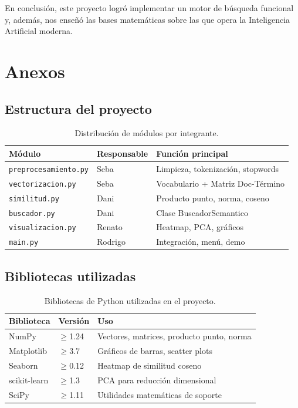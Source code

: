 \documentclass[12pt, a4paper]{article}
\begin{document}
En conclusión, este proyecto logró implementar un motor de búsqueda funcional y, además, nos enseñó las bases matemáticas sobre las que opera la Inteligencia Artificial moderna.

\section{Anexos}

\subsection{Estructura del proyecto}

\begin{table}[H]
\centering
\begin{tabular}{|l|l|l|}
\hline
\textbf{Módulo} & \textbf{Responsable} & \textbf{Función principal} \\
\hline
\texttt{preprocesamiento.py} & Seba & Limpieza, tokenización, stopwords \\
\texttt{vectorizacion.py} & Seba & Vocabulario + Matriz Doc-Término \\
\texttt{similitud.py} & Dani & Producto punto, norma, coseno \\
\texttt{buscador.py} & Dani & Clase BuscadorSemantico \\
\texttt{visualizacion.py} & Renato & Heatmap, PCA, gráficos \\
\texttt{main.py} & Rodrigo & Integración, menú, demo \\
\hline
\end{tabular}
\caption{Distribución de módulos por integrante.}
\end{table}

\subsection{Bibliotecas utilizadas}
\begin{table}[H]
\centering
\begin{tabular}{|l|l|l|}
\hline
\textbf{Biblioteca} & \textbf{Versión} & \textbf{Uso} \\
\hline
NumPy & $\geq$1.24 & Vectores, matrices, producto punto, norma \\
Matplotlib & $\geq$3.7 & Gráficos de barras, scatter plots \\
Seaborn & $\geq$0.12 & Heatmap de similitud coseno \\
scikit-learn & $\geq$1.3 & PCA para reducción dimensional \\
SciPy & $\geq$1.11 & Utilidades matemáticas de soporte \\
\hline
\end{tabular}
\caption{Bibliotecas de Python utilizadas en el proyecto.}
\end{table}
\end{document}
